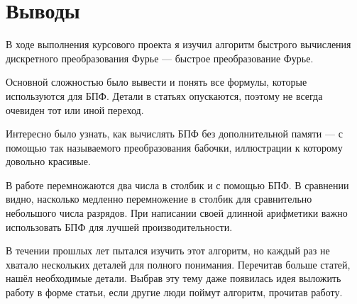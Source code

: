 \section{Выводы}
В ходе выполнения курсового проекта я изучил алгоритм быстрого вычисления дискретного преобразования Фурье --- быстрое преобразование Фурье.

Основной сложностью было вывести и понять все формулы, которые используются для БПФ. Детали в статьях опускаются, поэтому не всегда очевиден тот или иной переход.

Интересно было узнать, как вычислять БПФ без дополнительной памяти --- с помощью так называемого преобразования бабочки, иллюстрации к которому довольно красивые.

В работе перемножаются два числа в столбик и с помощью БПФ. В сравнении видно, насколько медленно перемножение в столбик для сравнительно небольшого числа разрядов. При написании своей длинной арифметики важно использовать БПФ для лучшей производительности.

В течении прошлых лет пытался изучить этот алгоритм, но каждый раз не хватало нескольких деталей для полного понимания. Перечитав больше статей, нашёл необходимые детали. Выбрав эту тему даже появилась идея выложить работу в форме статьи, если другие люди поймут алгоритм, прочитав работу.

\pagebreak
